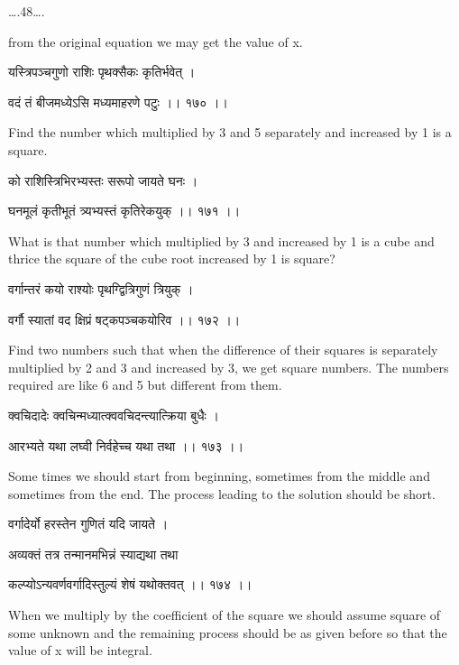 \documentclass[]{article}
\date{}
\begin{document}
{\ldots{}.48\ldots{}.}

{from the original equation we may get the value of x.}

{यस्त्रिपञ्चगुणो राशिः पृथक्सैकः कृतिर्भवेत् । }

{वदं तं बीजमध्येऽसि मध्यमाहरणे पटुः ।। १७० ।। }

{Find the number which multiplied by 3 and 5 separately and increased by
1 is a square.}

{को राशिस्त्रिभिरभ्यस्तः सरूपो जायते घनः । }

{घनमूलं कृतीभूतं त्र्यभ्यस्तं कृतिरेकयुक् ।। १७१ ।। }

{What is that number which multiplied by 3 and increased by 1 is a cube
and thrice the square of the cube root increased by 1 is square?}

{वर्गान्तरं कयो राश्योः पृथग्द्वित्रिगुणं त्रियुक् । }

{वर्गौ स्यातां वद क्षिप्रं षट्कपञ्चकयोरिव ।। १७२ ।। }

{Find two numbers such that when the difference of their squares is
separately multiplied by 2 and 3 and increased by 3, we get square
numbers. The numbers required are like 6 and 5 but different from them.}

{क्वचिदादेः क्वचिन्मध्यात्क्ववचिदन्त्यात्क्रिया बुधैः । }

{आरभ्यते यथा लघ्वी निर्वहेच्च यथा तथा ।। १७३ ।। }

{Some times we should start from beginning, sometimes from the middle
and sometimes from the end. The process leading to the solution should
be short.}

{वर्गादेर्यो हरस्तेन गुणितं यदि जायते । }

{अव्यक्तं तत्र तन्मानमभिन्नं स्याद्यथा तथा }

{कल्प्योऽन्यवर्णवर्गादिस्तुल्यं शेषं यथोक्तवत् ।। १७४ ।। }

{When we multiply by the coefficient of the square we should assume
square of some unknown and the remaining process should be as given
before so that the value of x will be integral.\\
}
\end{document}
